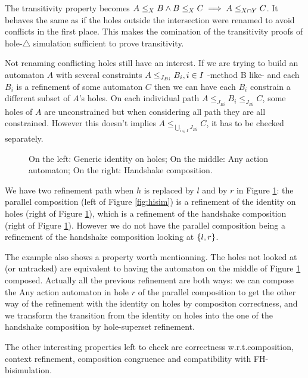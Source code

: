 \documentclass{article}
\begin{document}
The transitivity property becomes \(\wrel{A}{B}{X} \wedge \wrel{B}{C}{X} \implies \wrel{A}{C}{X \cap Y}\).
It behaves the same as if the holes outside the intersection were renamed to avoid conflicts in the first place.
This makes the comination of the transitivity proofs of hole-\(\triangle\) simulation sufficient to prove transitivity.

Not renaming conflicting holes still have an interest.
If we are trying to build an automaton \(A\) with several constraints \(\wrel{A}{B_i}{J_{Bi}}, i \in I\) -method B like- and each \(B_i\) is a refinement of some automaton \(C\) then we can have each \(B_i\) constrain a different subset of \(A\)'s holes.
On each individual path \(A \leq_{J_{Bi}} B_i \leq_{J_{Bi}} C\), some holes of \(A\) are unconstrained but when considering all path they are all constrained.
However this doesn't implies \(A \leq_{\bigcup_{i \in I} J_{Bi}} C\), it has to be checked separately.
\begin{exi}
\begin{figure}
\centering

\vrule

\vrule

\caption{On the left: Generic identity on holes; On the middle: Any action automaton; On the right: Handshake composition.}
\label{fig:sevpathref}
\end{figure}
We have two refinement path when \(h\) is replaced by \(l\) and by \(r\) in Figure \ref{fig:sevpathref}: the parallel composition (left of Figure \ref{fig:hisim}) is a refinement of the identity on holes (right of Figure \ref{fig:sevpathref}), which is a refinement of the handshake composition (right of Figure \ref{fig:sevpathref}).
However we do not have the parallel composition being a refinement of the handshake composition looking at \(\mbrc{l, r}\).

The example also shows a property worth mentionning.
The holes not looked at (or untracked) are equivalent to having the automaton on the middle of Figure \ref{fig:sevpathref} composed.
Actually all the previous refinement are both ways: we can compose the Any action automaton in hole \(r\) of the parallel composition to get the other way of the refinement with the identity on holes by compositon correctness, and we transform the transition from the identity on holes into the one of the handshake composition by hole-superset refinement.
\end{exi}
The other interesting properties left to check are correctness w.r.t.\@ composition, context refinement, composition congruence and compatibility with FH-bisimulation.
\end{document}

